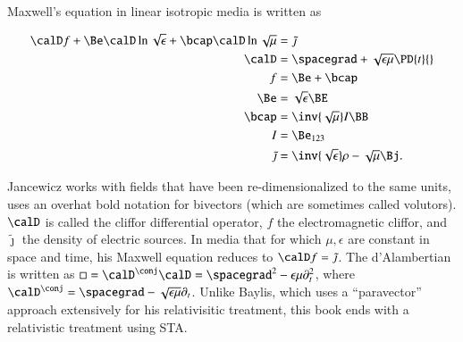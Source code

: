 Maxwell's equation in linear isotropic media is written as

\begin{dmath}\label{eqn:galiterature:20}
\begin{aligned}
\calD f + \Be \calD \ln \sqrt{\epsilon} + \bcap \calD \ln \sqrt{\mu} &= \tilde{\jmath} \\
\calD &= \spacegrad + \sqrt{\epsilon\mu} \PD{t}{} \\
f &= \Be + \bcap \\
\Be &= \sqrt{\epsilon} \BE \\
\bcap &= \inv{\sqrt{\mu}} I \BB \\
I &= \Be_{123} \\
\tilde{\jmath} &= \inv{\sqrt{\epsilon}}\rho - \sqrt{\mu} \Bj.
\end{aligned}
\end{dmath}

Jancewicz works with fields that have been re-dimensionalized to the same units, uses an overhat bold notation for bivectors (which are sometimes called volutors).
\( \calD \) is called the cliffor differential operator, \( f \) the electromagnetic cliffor, and \( \tilde{\jmath} \) the density of electric sources.
In media that for which \( \mu, \epsilon \) are constant in space and time, his Maxwell equation reduces to \( \calD f = \tilde{\jmath} \).
The d'Alambertian is written
as \( \Box = \calD^\conj \calD = \spacegrad^2 - \epsilon\mu \partial_t^2 \), where
\( \calD^\conj = \spacegrad - \sqrt{\epsilon\mu} \partial_t \).
Unlike Baylis, which uses a
``paravector'' approach extensively for his relativisitic treatment,
this book ends with a relativistic treatment using STA.

